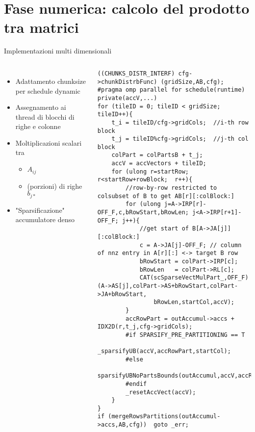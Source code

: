 \section{Fase numerica: calcolo del prodotto tra matrici}
\begin{frame}[fragile]  {Implementazioni multi dimensionali}
\begin{columns}
	\begin{itemize}
		\item	Adattamento chunksize per schedule dynamic
		\item	Assegnamento ai thread di blocchi di righe e colonne
		\item	Moltiplicazioni scalari tra
		\begin{itemize}
			\item	$A_{ij}$
			\item	(porzioni) di righe $b_{j*}$
		\end{itemize}
		\item	"Sparsificazione" accumulatore denso
	\end{itemize}

	\begin{lstlisting}
((CHUNKS_DISTR_INTERF) cfg->chunkDistrbFunc) (gridSize,AB,cfg);
#pragma omp parallel for schedule(runtime) private(accV,...)
for (tileID = 0; tileID < gridSize; tileID++){
    t_i = tileID/cfg->gridCols;  //i-th row block
    t_j = tileID%cfg->gridCols;  //j-th col block
    colPart = colPartsB + t_j;
    accV = accVectors + tileID; 
    for (ulong r=startRow;  r<startRow+rowBlock;  r++){
        //row-by-row restricted to colsubset of B to get AB[r][:colBlock:]
        for (ulong j=A->IRP[r]-OFF_F,c,bRowStart,bRowLen; j<A->IRP[r+1]-OFF_F; j++){
            //get start of B[A->JA[j]][:colBlock:]
            c = A->JA[j]-OFF_F; // column of nnz entry in A[r][:] <-> target B row
            bRowStart = colPart->IRP[c];
            bRowLen   = colPart->RL[c];
            CAT(scSparseVectMulPart_,OFF_F)(A->AS[j],colPart->AS+bRowStart,colPart->JA+bRowStart,
                bRowLen,startCol,accV);
        }
        accRowPart = outAccumul->accs + IDX2D(r,t_j,cfg->gridCols);
		#if SPARSIFY_PRE_PARTITIONING == T
		_sparsifyUB(accV,accRowPart,startCol);
		#else
        sparsifyUBNoPartsBounds(outAccumul,accV,accRowPart,startCol);
		#endif
        _resetAccVect(accV);
    }
}
if (mergeRowsPartitions(outAccumul->accs,AB,cfg))  goto _err;
	\end{lstlisting}
\end{columns}
\end{frame}	

